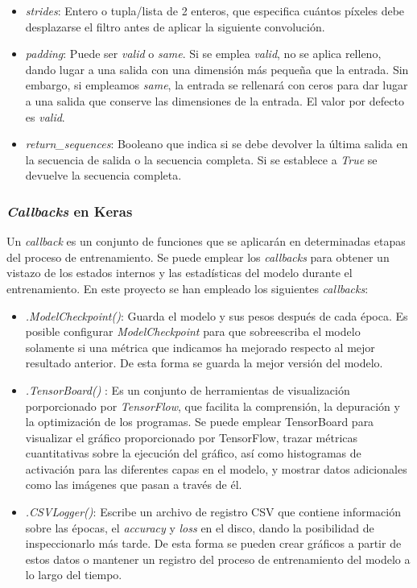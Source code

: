 \begin{itemize}
\begin{itemize}
            \item \textit{strides}: Entero o tupla/lista de 2 enteros, que especifica cuántos píxeles debe desplazarse el filtro antes de aplicar la siguiente convolución.
            
            \item \textit{padding}: Puede ser \textit{valid} o \textit{same}. Si se emplea \textit{valid}, no se aplica relleno, dando lugar a una salida con una dimensión más pequeña que la entrada. Sin embargo, si empleamos \textit{same}, la entrada se rellenará con ceros para dar lugar a una salida que conserve las dimensiones de la entrada. El valor por defecto es \textit{valid}.
            
            \item \textit{return\_sequences}: Booleano que indica si se debe devolver la última salida en la secuencia de salida o la secuencia completa. Si se establece a \textit{True} se devuelve la secuencia completa.
        \end{itemize}
\end{itemize}


\subsubsection{\textit{Callbacks} en Keras} \label{callback}

Un \textit{callback} es un conjunto de funciones que se aplicarán en determinadas etapas del proceso de entrenamiento. Se puede emplear los \textit{callbacks} para obtener un vistazo de los estados internos y las estadísticas del modelo durante el entrenamiento. En este proyecto se han empleado los siguientes \textit{callbacks}:

\begin{itemize}
    \item \textit{.ModelCheckpoint()}: Guarda el modelo y sus pesos después de cada época. Es posible configurar \textit{ModelCheckpoint} para que sobreescriba el modelo solamente si una métrica que indicamos ha mejorado respecto al mejor resultado anterior. De esta forma se guarda la mejor versión del modelo.
    
    \item \textit{.TensorBoard()} \cite{tensorboard}: Es un conjunto de herramientas de visualización porporcionado por \textit{TensorFlow}, que facilita la comprensión, la depuración y la optimización de los programas. Se puede emplear TensorBoard para visualizar el gráfico proporcionado por TensorFlow, trazar métricas cuantitativas sobre la ejecución del gráfico, así como histogramas de activación para las diferentes capas en el modelo, y mostrar datos adicionales como las imágenes que pasan a través de él. 
    
    \item \textit{.CSVLogger()}: Escribe un archivo de registro CSV que contiene información sobre las épocas, el \textit{accuracy} y \textit{loss} en el disco, dando la posibilidad de inspeccionarlo más tarde. De esta forma se pueden crear gráficos a partir de estos datos o mantener un registro del proceso de entrenamiento del modelo a lo largo del tiempo.
\end{itemize}

